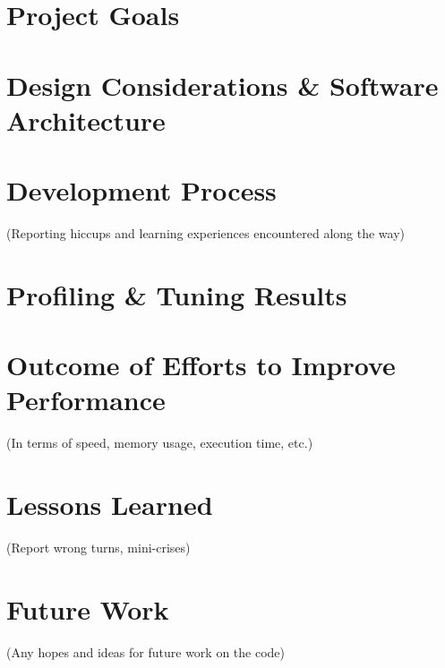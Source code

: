 \documentclass[10pt,twocolumn,letterpaper]{article}
\begin{document}
\section*{Project Goals}


\section*{Design Considerations \& Software Architecture}


\section*{Development Process}
(Reporting hiccups and learning experiences encountered along the way)


\section*{Profiling \& Tuning Results}


\section*{Outcome of Efforts to Improve Performance}
(In terms of speed, memory usage, execution time, etc.)

\section*{Lessons Learned}
(Report wrong turns, mini-crises) 

\section*{Future Work}
(Any hopes and ideas for future work on the code)


\end{document}
